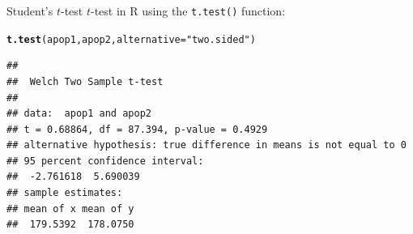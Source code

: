 \documentclass[aspectratio=169]{beamer}\usepackage[]{graphicx}\usepackage[]{color}
\makeatletter
\newcommand{\hlstr}[1]{\textcolor[rgb]{0.192,0.494,0.8}{#1}}%
\newcommand{\hlstd}[1]{\textcolor[rgb]{0.345,0.345,0.345}{#1}}%
\newcommand{\hlkwc}[1]{\textcolor[rgb]{0.333,0.667,0.333}{#1}}%
\newcommand{\hlkwd}[1]{\textcolor[rgb]{0.737,0.353,0.396}{\textbf{#1}}}%
\newenvironment{kframe}{%
 \def\at@end@of@kframe{}%
 \ifinner\ifhmode%
  \def\at@end@of@kframe{\end{minipage}}%
  \begin{minipage}{\columnwidth}%
 \fi\fi%
 \def\FrameCommand##1{\hskip\@totalleftmargin \hskip-\fboxsep
 \colorbox{shadecolor}{##1}\hskip-\fboxsep
     \hskip-\linewidth \hskip-\@totalleftmargin \hskip\columnwidth}%
 \MakeFramed {\advance\hsize-\width
   \@totalleftmargin\z@ \linewidth\hsize
   \@setminipage}}%
 {\par\unskip\endMakeFramed%
 \at@end@of@kframe}
\newenvironment{knitrout}{}{} %
\makeatother
\begin{document}
\begin{frame}[fragile]{Student's $t$-test}
$t$-test in R using the \texttt{t.test()} function:
\begin{knitrout}\scriptsize
{}\color{fgcolor}\begin{kframe}
\begin{alltt}
\hlkwd{t.test}\hlstd{(apop1, apop2,} \hlkwc{alternative} \hlstd{=} \hlstr{"two.sided"}\hlstd{)}
\end{alltt}
\begin{verbatim}
## 
## 	Welch Two Sample t-test
## 
## data:  apop1 and apop2
## t = 0.68864, df = 87.394, p-value = 0.4929
## alternative hypothesis: true difference in means is not equal to 0
## 95 percent confidence interval:
##  -2.761618  5.690039
## sample estimates:
## mean of x mean of y 
##  179.5392  178.0750
\end{verbatim}
\end{kframe}
\end{knitrout}
\end{frame}
\end{document}
